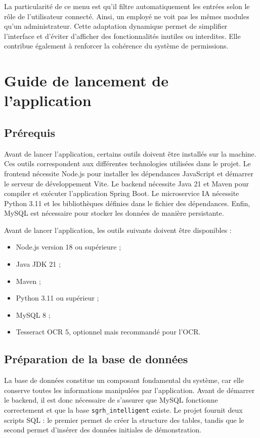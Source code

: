 \documentclass[12pt,a4paper]{report}
\begin{document}
La particularité de ce menu est qu'il filtre automatiquement les entrées selon le rôle de l'utilisateur connecté. Ainsi, un employé ne voit pas les mêmes modules qu'un administrateur. Cette adaptation dynamique permet de simplifier l'interface et d'éviter d'afficher des fonctionnalités inutiles ou interdites. Elle contribue également à renforcer la cohérence du système de permissions.

\chapter{Guide de lancement de l'application}

\section{Prérequis}

Avant de lancer l'application, certains outils doivent être installés sur la machine. Ces outils correspondent aux différentes technologies utilisées dans le projet. Le frontend nécessite Node.js pour installer les dépendances JavaScript et démarrer le serveur de développement Vite. Le backend nécessite Java 21 et Maven pour compiler et exécuter l'application Spring Boot. Le microservice IA nécessite Python 3.11 et les bibliothèques définies dans le fichier des dépendances. Enfin, MySQL est nécessaire pour stocker les données de manière persistante.

Avant de lancer l'application, les outils suivants doivent être disponibles :

\begin{itemize}
    \item Node.js version 18 ou supérieure ;
    \item Java JDK 21 ;
    \item Maven ;
    \item Python 3.11 ou supérieur ;
    \item MySQL 8 ;
    \item Tesseract OCR 5, optionnel mais recommandé pour l'OCR.
\end{itemize}

\section{Préparation de la base de données}

La base de données constitue un composant fondamental du système, car elle conserve toutes les informations manipulées par l'application. Avant de démarrer le backend, il est donc nécessaire de s'assurer que MySQL fonctionne correctement et que la base \texttt{sgrh\_intelligent} existe. Le projet fournit deux scripts SQL : le premier permet de créer la structure des tables, tandis que le second permet d'insérer des données initiales de démonstration.
\end{document}
